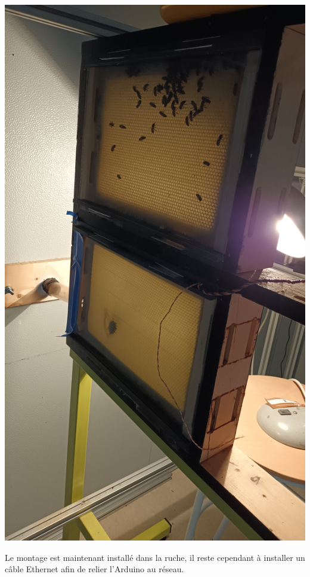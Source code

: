 \documentclass[11pt,french,a4paper]{article}
\begin{document}
\begin{center}
    \includegraphics[scale=0.1,angle=270]{../img/RC.png}
    \label{RC}
\end{center}
Le montage est maintenant installé dans la ruche, il reste cependant à installer un câble Ethernet afin de relier l'Arduino au réseau.
\end{document}
